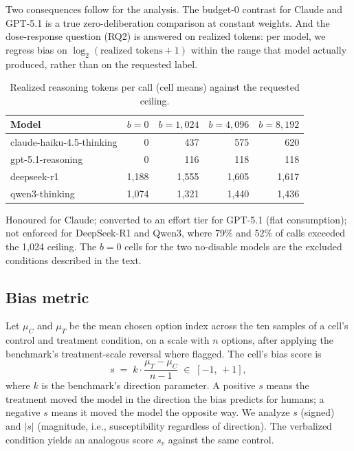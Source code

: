 \documentclass[conference]{IEEEtran}
\begin{document}
Two consequences follow for the analysis. The budget-0 contrast for Claude and GPT-5.1 is a true zero-deliberation comparison at constant weights. And the dose-response question (RQ2) is answered on realized tokens: per model, we regress bias on $\log_2(\text{realized tokens}+1)$ within the range that model actually produced, rather than on the requested label.

\begin{table}[!t]
\centering
\caption{Realized reasoning tokens per call (cell means) against the requested ceiling.}
\label{tab:tokens}
\footnotesize
\setlength{\tabcolsep}{4pt}
\begin{tabular}{lrrrr}
\hline
Model & $b=0$ & $b=1{,}024$ & $b=4{,}096$ & $b=8{,}192$ \\
\hline
claude-haiku-4.5-thinking & 0 & 437 & 575 & 620 \\
gpt-5.1-reasoning & 0 & 116 & 118 & 118 \\
deepseek-r1 & 1,188 & 1,555 & 1,605 & 1,617 \\
qwen3-thinking & 1,074 & 1,321 & 1,440 & 1,436 \\
\hline
\end{tabular}
\par\smallskip\footnotesize Honoured for Claude; converted to an effort tier for GPT-5.1 (flat consumption); not enforced for DeepSeek-R1 and Qwen3, where 79\% and 52\% of calls exceeded the 1,024 ceiling. The $b=0$ cells for the two no-disable models are the excluded conditions described in the text.
\end{table}

\subsection{Bias metric}
Let $\mu_C$ and $\mu_T$ be the mean chosen option index across the ten samples of a cell's control and treatment condition, on a scale with $n$ options, after applying the benchmark's treatment-scale reversal where flagged. The cell's bias score is
\begin{equation}
s \;=\; k \cdot \frac{\mu_T - \mu_C}{\,n - 1\,} \;\in\; [-1,\, +1],
\label{eq:score}
\end{equation}
where $k$ is the benchmark's direction parameter. A positive $s$ means the treatment moved the model in the direction the bias predicts for humans; a negative $s$ means it moved the model the opposite way. We analyze $s$ (signed) and $|s|$ (magnitude, i.e., susceptibility regardless of direction). The verbalized condition yields an analogous score $s_v$ against the same control.
\end{document}
